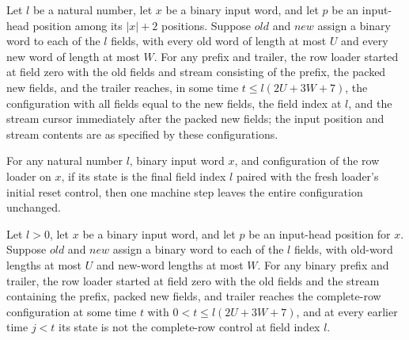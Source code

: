 \begin{lemma}
\label{Complexity.clLoad_complete}
\leanok
{}
Let $l$ be a natural number, let $x$ be a binary input word, and let $p$ be an
input-head position among its $|x|+2$ positions. Suppose $old$ and $new$ assign a binary
word to each of the $l$ fields, with every old word of length at most $U$ and every new
word of length at most $W$. For any prefix and trailer, the row loader started at field
zero with the old fields and stream consisting of the prefix, the packed new fields, and
the trailer reaches, in some time $t\le l(2U+3W+7)$, the configuration with all fields
equal to the new fields, the field index at $l$, and the stream cursor immediately after
the packed new fields; the input position and stream contents are as specified by these
configurations.
\end{lemma}

\begin{lemma}
\label{Complexity.clLoad_idle}
\leanok
{}
For any natural number $l$, binary input word $x$, and configuration of the row loader
on $x$, if its state is the final field index $l$ paired with the fresh loader’s initial
reset control, then one machine step leaves the entire configuration unchanged.
\end{lemma}

\begin{lemma}
\label{Complexity.clLoad_first}
\leanok
{}
Let $l>0$, let $x$ be a binary input word, and let $p$ be an input-head position for
$x$. Suppose $old$ and $new$ assign a binary word to each of the $l$ fields, with
old-word lengths at most $U$ and new-word lengths at most $W$. For any binary prefix and
trailer, the row loader started at field zero with the old fields and the stream
containing the prefix, packed new fields, and trailer reaches the complete-row
configuration at some time $t$ with $0<t\le l(2U+3W+7)$, and at every earlier time $j<t$
its state is not the complete-row control at field index $l$.
\end{lemma}

